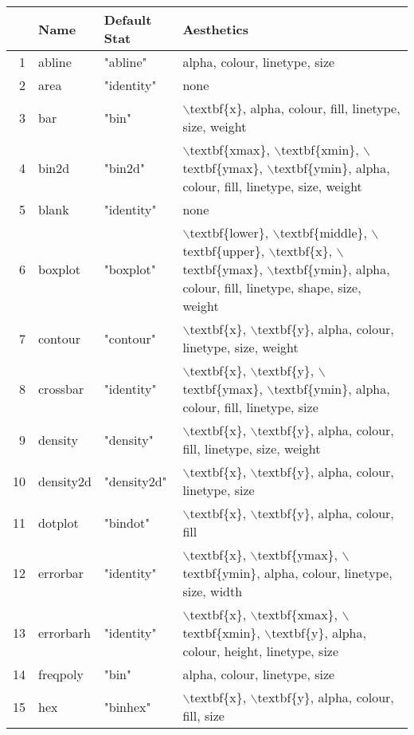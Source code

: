 \begin{table}[ht]
\centering
\begin{tabular}{rlll}
  \hline
 & Name & Default Stat & Aesthetics \\ 
  \hline
1 & abline & "abline" & alpha, colour, linetype, size \\ 
  2 & area & "identity" & none \\ 
  3 & bar & "bin" & $\backslash$textbf\{x\}, alpha, colour, fill, linetype, size, weight \\ 
  4 & bin2d & "bin2d" & $\backslash$textbf\{xmax\}, $\backslash$textbf\{xmin\}, $\backslash$textbf\{ymax\}, $\backslash$textbf\{ymin\}, alpha, colour, fill, linetype, size, weight \\ 
  5 & blank & "identity" & none \\ 
  6 & boxplot & "boxplot" & $\backslash$textbf\{lower\}, $\backslash$textbf\{middle\}, $\backslash$textbf\{upper\}, $\backslash$textbf\{x\}, $\backslash$textbf\{ymax\}, $\backslash$textbf\{ymin\}, alpha, colour, fill, linetype, shape, size, weight \\ 
  7 & contour & "contour" & $\backslash$textbf\{x\}, $\backslash$textbf\{y\}, alpha, colour, linetype, size, weight \\ 
  8 & crossbar & "identity" & $\backslash$textbf\{x\}, $\backslash$textbf\{y\}, $\backslash$textbf\{ymax\}, $\backslash$textbf\{ymin\}, alpha, colour, fill, linetype, size \\ 
  9 & density & "density" & $\backslash$textbf\{x\}, $\backslash$textbf\{y\}, alpha, colour, fill, linetype, size, weight \\ 
  10 & density2d & "density2d" & $\backslash$textbf\{x\}, $\backslash$textbf\{y\}, alpha, colour, linetype, size \\ 
  11 & dotplot & "bindot" & $\backslash$textbf\{x\}, $\backslash$textbf\{y\}, alpha, colour, fill \\ 
  12 & errorbar & "identity" & $\backslash$textbf\{x\}, $\backslash$textbf\{ymax\}, $\backslash$textbf\{ymin\}, alpha, colour, linetype, size, width \\ 
  13 & errorbarh & "identity" & $\backslash$textbf\{x\}, $\backslash$textbf\{xmax\}, $\backslash$textbf\{xmin\}, $\backslash$textbf\{y\}, alpha, colour, height, linetype, size \\ 
  14 & freqpoly & "bin" & alpha, colour, linetype, size \\ 
  15 & hex & "binhex" & $\backslash$textbf\{x\}, $\backslash$textbf\{y\}, alpha, colour, fill, size \\ 

\end{tabular}
\end{table}

